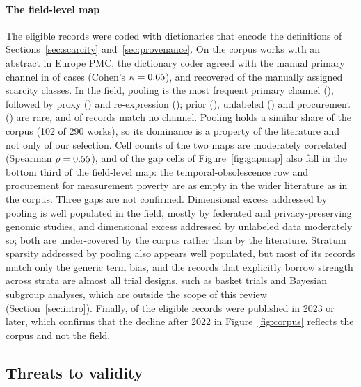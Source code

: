 \documentclass[acmsmall,screen,review]{acmart}
\theoremstyle{acmdefinition}
\begin{document}
\paragraph{The field-level map} The \PrismaEligible{} eligible records were coded with dictionaries that encode the definitions of Sections~\ref{sec:scarcity} and~\ref{sec:provenance}. On the \PrismaCoderN{} corpus works with an abstract in Europe PMC, the dictionary coder agreed with the manual primary channel in \PrismaCoderAgree{} of cases (Cohen's $\kappa=0.65$), and recovered \PrismaCoderClassRecall{} of the manually assigned scarcity classes. In the field, pooling is the most frequent primary channel (\PrismaFieldA), followed by proxy (\PrismaFieldB) and re-expression (\PrismaFieldF); prior (\PrismaFieldC), unlabeled (\PrismaFieldD) and procurement (\PrismaFieldE) are rare, and \PrismaFieldNone{} of records match no channel. Pooling holds a similar share of the corpus (102 of 290 works), so its dominance is a property of the literature and not only of our selection. Cell counts of the two maps are moderately correlated (Spearman $\rho=0.55$), and \PrismaGapsConfirmed{} of the \PrismaGapsTotal{} gap cells of Figure~\ref{fig:gapmap} also fall in the bottom third of the field-level map: the temporal-obsolescence row and procurement for measurement poverty are as empty in the wider literature as in the corpus. Three gaps are not confirmed. Dimensional excess addressed by pooling is well populated in the field, mostly by federated and privacy-preserving genomic studies, and dimensional excess addressed by unlabeled data moderately so; both are under-covered by the corpus rather than by the literature. Stratum sparsity addressed by pooling also appears well populated, but most of its records match only the generic term bias, and the records that explicitly borrow strength across strata are almost all trial designs, such as basket trials and Bayesian subgroup analyses, which are outside the scope of this review (Section~\ref{sec:intro}). Finally, \PrismaSince{} of the eligible records were published in 2023 or later, which confirms that the decline after 2022 in Figure~\ref{fig:corpus} reflects the corpus and not the field.

\subsection{Threats to validity}
\end{document}
